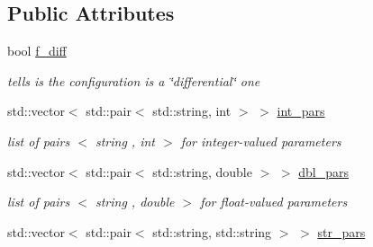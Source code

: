 \subsection*{Public Attributes}
\begin{DoxyCompactItemize}
\item 
\mbox{\label{class_s_m_spp__di__unipi__it_1_1_compute_config_af320d149581e7a57ddf42fcdc1c1753c}} 
bool \mbox{\hyperlink{class_s_m_spp__di__unipi__it_1_1_compute_config_af320d149581e7a57ddf42fcdc1c1753c}{f\+\_\+diff}}
\begin{DoxyCompactList}\small\item\em tells is the configuration is a \char`\"{}differential\char`\"{} one \end{DoxyCompactList}\item 
\mbox{\label{class_s_m_spp__di__unipi__it_1_1_compute_config_a08f3dfa457df583d8bbe6bbfcde057f8}} 
std\+::vector$<$ std\+::pair$<$ std\+::string, int $>$ $>$ \mbox{\hyperlink{class_s_m_spp__di__unipi__it_1_1_compute_config_a08f3dfa457df583d8bbe6bbfcde057f8}{int\+\_\+pars}}
\begin{DoxyCompactList}\small\item\em list of pairs $<$ string , int $>$ for integer-\/valued parameters \end{DoxyCompactList}\item 
\mbox{\label{class_s_m_spp__di__unipi__it_1_1_compute_config_adc5d0cb0cdaddda1fadd9bb14f688cde}} 
std\+::vector$<$ std\+::pair$<$ std\+::string, double $>$ $>$ \mbox{\hyperlink{class_s_m_spp__di__unipi__it_1_1_compute_config_adc5d0cb0cdaddda1fadd9bb14f688cde}{dbl\+\_\+pars}}
\begin{DoxyCompactList}\small\item\em list of pairs $<$ string , double $>$ for float-\/valued parameters \end{DoxyCompactList}\item 
\mbox{\label{class_s_m_spp__di__unipi__it_1_1_compute_config_a6985f996f7b6eac1effd036488d25972}} 
std\+::vector$<$ std\+::pair$<$ std\+::string, std\+::string $>$ $>$ \mbox{\hyperlink{class_s_m_spp__di__unipi__it_1_1_compute_config_a6985f996f7b6eac1effd036488d25972}{str\+\_\+pars}}

\end{DoxyCompactItemize}
